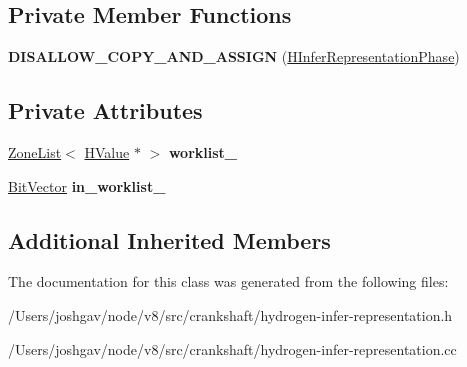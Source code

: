 \subsection*{Private Member Functions}
\begin{DoxyCompactItemize}
\item 
{\bfseries D\+I\+S\+A\+L\+L\+O\+W\+\_\+\+C\+O\+P\+Y\+\_\+\+A\+N\+D\+\_\+\+A\+S\+S\+I\+GN} (\hyperlink{classv8_1_1internal_1_1_h_infer_representation_phase}{H\+Infer\+Representation\+Phase})\hypertarget{classv8_1_1internal_1_1_h_infer_representation_phase_a6c1851cb222b02ebf534871743c0aef6}{}\label{classv8_1_1internal_1_1_h_infer_representation_phase_a6c1851cb222b02ebf534871743c0aef6}

\end{DoxyCompactItemize}
\subsection*{Private Attributes}
\begin{DoxyCompactItemize}
\item 
\hyperlink{classv8_1_1internal_1_1_zone_list}{Zone\+List}$<$ \hyperlink{classv8_1_1internal_1_1_h_value}{H\+Value} $\ast$ $>$ {\bfseries worklist\+\_\+}\hypertarget{classv8_1_1internal_1_1_h_infer_representation_phase_ac62acc126fb0104b36c9c30d87c690c0}{}\label{classv8_1_1internal_1_1_h_infer_representation_phase_ac62acc126fb0104b36c9c30d87c690c0}

\item 
\hyperlink{classv8_1_1internal_1_1_bit_vector}{Bit\+Vector} {\bfseries in\+\_\+worklist\+\_\+}\hypertarget{classv8_1_1internal_1_1_h_infer_representation_phase_a7978f51829bc604bc811898b65573355}{}\label{classv8_1_1internal_1_1_h_infer_representation_phase_a7978f51829bc604bc811898b65573355}

\end{DoxyCompactItemize}
\subsection*{Additional Inherited Members}


The documentation for this class was generated from the following files\+:\begin{DoxyCompactItemize}
\item 
/\+Users/joshgav/node/v8/src/crankshaft/hydrogen-\/infer-\/representation.\+h\item 
/\+Users/joshgav/node/v8/src/crankshaft/hydrogen-\/infer-\/representation.\+cc\end{DoxyCompactItemize}
